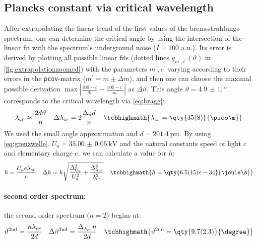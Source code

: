 \clearpage
\subsection{Plancks constant via critical wavelength}
After extrapolating the linear trend of the first values of the bremsstrahlungs-spectrum, one can determine the critical angle by using the intersection of the linear fit with the spectrum's underground noise (\(I=100\) a.u.). Its error is derived by plotting all possible linear fits (dotted lines \(g_{m^\prime,c^\prime}(\vartheta)\) in \cref{fig:extrapolationzoomed}) with the parameters \(m^\prime,c^\prime\) varying according to their errors in the \verb|pcov|-matrix (\(m^\prime=m\pm\Delta m\)), and then one can choose the maximal possible derivation \(\max|\frac{100-c}{m}-\frac{100-c^\prime}{m^\prime}|\) as \(\Delta \vartheta\). This angle \(\vartheta=\qty{4.9(1.0)}{\degree}\) corresponds to the critical wavelength via \cref{eq:bragg}:
\begin{align}
    \lambda_{cr}\approx\frac{2d\vartheta}{n}&&\Delta \lambda_{cr}=2 \frac{\Delta_{\vartheta} d}{n}&&\tcbhighmath{\lambda_{cr}=\qty{35(8)}{\pico\m}}\label{eq:lambdacr}
\end{align}
We used the small angle approximation and \(d=\qty{201.4}{\pico\m}\)\autocite{Skript_2.2}. By using \cref{eq:grenzwelle}, \(U_a=\qty{35.00(5)}{\kilo\volt}\) and the natural constants speed of light \(c\) and elementary charge \(e\),  we can calculate a value for \(h\):
\begin{align}
    h=\frac{U_{a} e \lambda_{cr}}{c}&&\Delta h=h\sqrt{\frac{\Delta_{U_a}^{2}}{U_{a}^{2}} + \frac{\Delta_{\lambda_{cr}}^{2}}{\lambda_{cr}^{2}}}&&\tcbhighmath{h=\qty{6.5(15)e-34}{\joule\s}}\label{eq:h}
\end{align}
\paragraph{second order spectrum:} the second order spectrum (\(n=2\)) begins at:
\begin{align}
    \vartheta^\text{2nd}=\frac{n\lambda_{cr}}{2d}&&\Delta \vartheta^\text{2nd}=\frac{\Delta_{\lambda_{cr}} n}{2d}&&\tcbhighmath{\vartheta^\text{2nd}=\qty{9.7(2.3)}{\degree}}
\end{align} 


